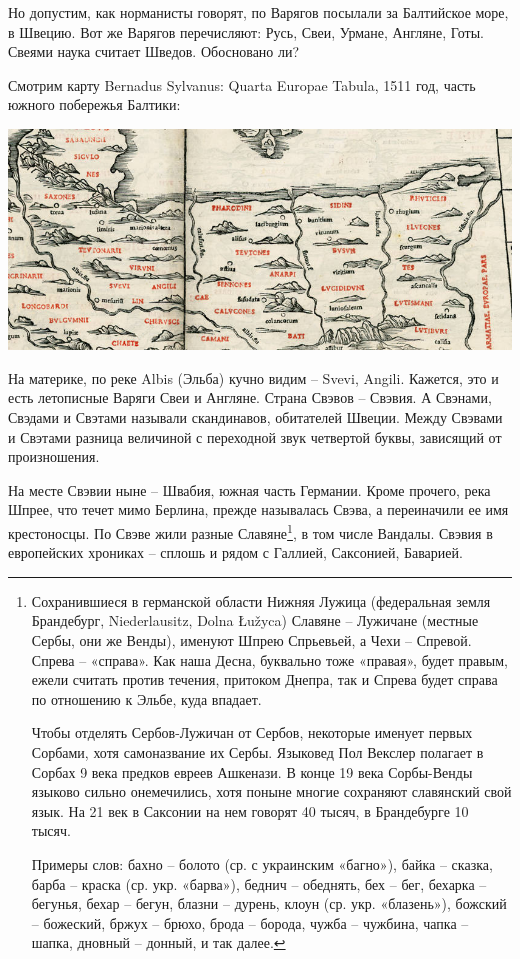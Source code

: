 Но допустим, как норманисты говорят, по Варягов посылали за Балтийское море, в Швецию. Вот же Варягов перечисляют: Русь, Свеи, Урмане, Англяне, Готы. Свеями наука считает Шведов. Обосновано ли?

Смотрим карту Bernadus Sylvanus: Quarta Europae Tabula, 1511 год, часть южного побережья Балтики:

\begin{center}
\includegraphics[width=\linewidth]{chast-colebanie-osnov/polane/svevi01.jpg}
\end{center} 

На материке, по реке Albis (Эльба) кучно видим – Svevi, Angili. Кажется, это и есть летописные Варяги Свеи и Англяне. Страна Свэвов – Свэвия. А Свэнами, Свэдами и Свэтами называли скандинавов, обитателей Швеции. Между Свэвами и Свэтами разница величиной с переходной звук четвертой буквы, зависящий от произношения. 

На месте Свэвии ныне – Швабия, южная часть Германии. Кроме прочего, река Шпрее, что течет мимо Берлина, прежде называлась Свэва, а переиначили ее имя крестоносцы. По Свэве жили разные Славяне\footnote{Сохранившиеся в германской области Нижняя Лужица (федеральная земля Брандебург, Niederlausitz, Dolna Łužyca) Славяне – Лужичане (местные Сербы, они же Венды), именуют Шпрею Спрьевьей, а Чехи – Спревой. Спрева – «справа». Как наша Десна, буквально тоже «правая», будет правым, ежели считать против течения, притоком Днепра, так и Спрева будет справа по отношению к Эльбе, куда впадает. 

Чтобы отделять Сербов-Лужичан от Сербов, некоторые именует первых Сорбами, хотя самоназвание их Сербы. Языковед Пол Векслер полагает в Сорбах 9 века предков евреев Ашкенази. В конце 19 века Сорбы-Венды языково сильно онемечились, хотя поныне многие сохраняют славянский свой язык. На 21 век в Саксонии на нем говорят 40 тысяч, в Брандебурге 10 тысяч.

Примеры слов: бахно – болото (ср. с украинским «багно»), байка – сказка, барба – краска (ср. укр. «барва»), беднич – обеднять, бех – бег, бехарка – бегунья, бехар – бегун, блазни – дурень, клоун (ср. укр. «блазень»), божский – божеский, бржух – брюхо, брода – борода, чужба – чужбина, чапка – шапка, дновный – донный, и так далее.}, в том числе Вандалы. Свэвия в европейских хрониках – сплошь и рядом с Галлией, Саксонией, Баварией. 

